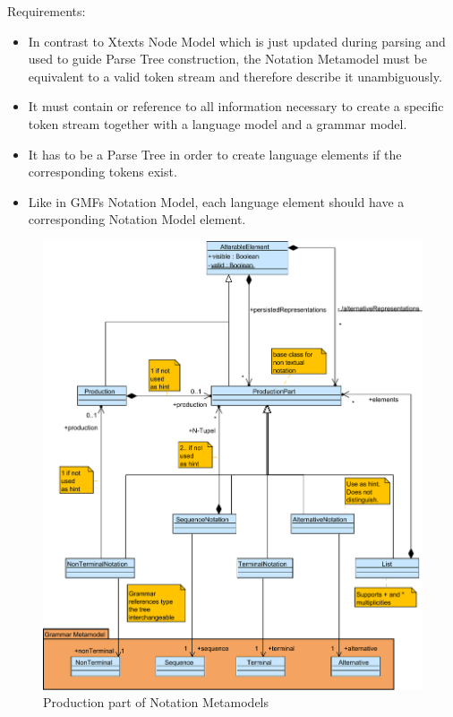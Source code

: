 Requirements:
\begin{itemize}
	\item In contrast to Xtexts Node Model which is just updated during parsing and used to guide Parse Tree construction, the Notation Metamodel must be equivalent to a valid token stream and therefore describe it unambiguously. 
	\item It must contain or reference to all information necessary to create a specific token stream together with a language model and a grammar model.   
	\item It has to be a Parse Tree in order to create language elements if the corresponding tokens exist.
	\item Like in GMFs Notation Model, each language element should have a corresponding Notation Model element.
\end{itemize}


\begin{figure}
\centering
\includegraphics[scale=0.65]{gfx/ex/Notation_Prod} 
\caption{Production part of Notation Metamodels}
\label{MM:Not:Prod}
\end{figure}

